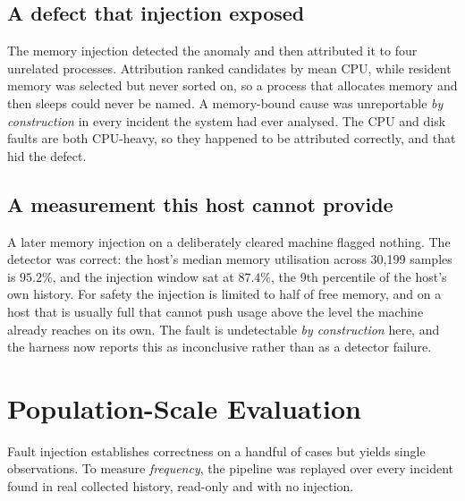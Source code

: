 \documentclass[conference]{IEEEtran}
\begin{document}
\subsection{A defect that injection exposed}

The memory injection detected the anomaly and then attributed it to four
unrelated processes. Attribution ranked candidates by mean CPU, while resident
memory was selected but never sorted on, so a process that allocates memory
and then sleeps could never be named. A memory-bound cause was unreportable
\emph{by construction} in every incident the system had ever analysed. The CPU
and disk faults are both CPU-heavy, so they happened to be attributed
correctly, and that hid the defect.

\subsection{A measurement this host cannot provide}

A later memory injection on a deliberately cleared machine flagged nothing.
The detector was correct: the host's median memory utilisation across 30{,}199
samples is $95.2\%$, and the injection window sat at $87.4\%$, the 9th
percentile of the host's own history. For safety the injection is limited to
half of free memory, and on a host that is usually full that cannot push usage
above the level the machine already reaches on its own. The fault is undetectable \emph{by construction} here,
and the harness now reports this as inconclusive rather than as a detector
failure.

\section{Population-Scale Evaluation}
\label{sec:population}

Fault injection establishes correctness on a handful of cases but yields single
observations. To measure \emph{frequency}, the pipeline was replayed over every
incident found in real collected history, read-only and with no injection.
\end{document}
